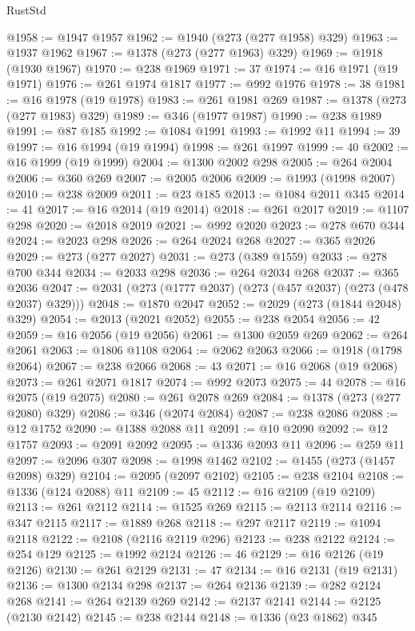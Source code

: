 \begin{lexlean}{RustStd}
\begin{coremodule}
{\begin{coremodule}
{{{{{{{{{{{{{{{{{{{{{{{{{{{{{{{{{{{{{{{{{{{{{{{{{{{{{{{{{{{{{{{{{{{{{{{{{{{{{{{{{{{{{@1958 := @1947 @1957
@1962 := @1940 (@273 (@277 @1958) @329)
@1963 := @1937 @1962
@1967 := @1378 (@273 (@277 @1963) @329)
@1969 := @1918 (@1930 @1967)
@1970 := @238 @1969
@1971 := 37
@1974 := @16 @1971 (@19 @1971)
@1976 := @261 @1974 @1817
@1977 := @992 @1976
@1978 := 38
@1981 := @16 @1978 (@19 @1978)
@1983 := @261 @1981 @269
@1987 := @1378 (@273 (@277 @1983) @329)
@1989 := @346 (@1977 @1987)
@1990 := @238 @1989
@1991 := @87 @185
@1992 := @1084 @1991
@1993 := @1992 @11
@1994 := 39
@1997 := @16 @1994 (@19 @1994)
@1998 := @261 @1997
@1999 := 40
@2002 := @16 @1999 (@19 @1999)
@2004 := @1300 @2002 @298
@2005 := @264 @2004
@2006 := @360 @269
@2007 := @2005 @2006
@2009 := @1993 (@1998 @2007)
@2010 := @238 @2009
@2011 := @23 @185
@2013 := @1084 @2011 @345
@2014 := 41
@2017 := @16 @2014 (@19 @2014)
@2018 := @261 @2017
@2019 := @1107 @298
@2020 := @2018 @2019
@2021 := @992 @2020
@2023 := @278 @670 @344
@2024 := @2023 @298
@2026 := @264 @2024 @268
@2027 := @365 @2026
@2029 := @273 (@277 @2027)
@2031 := @273 (@389 @1559)
@2033 := @278 @700 @344
@2034 := @2033 @298
@2036 := @264 @2034 @268
@2037 := @365 @2036
@2047 := @2031 (@273 (@1777 @2037) (@273 (@457 @2037) (@273 (@478 @2037) @329)))
@2048 := @1870 @2047
@2052 := @2029 (@273 (@1844 @2048) @329)
@2054 := @2013 (@2021 @2052)
@2055 := @238 @2054
@2056 := 42
@2059 := @16 @2056 (@19 @2056)
@2061 := @1300 @2059 @269
@2062 := @264 @2061
@2063 := @1806 @1108
@2064 := @2062 @2063
@2066 := @1918 (@1798 @2064)
@2067 := @238 @2066
@2068 := 43
@2071 := @16 @2068 (@19 @2068)
@2073 := @261 @2071 @1817
@2074 := @992 @2073
@2075 := 44
@2078 := @16 @2075 (@19 @2075)
@2080 := @261 @2078 @269
@2084 := @1378 (@273 (@277 @2080) @329)
@2086 := @346 (@2074 @2084)
@2087 := @238 @2086
@2088 := @12 @1752
@2090 := @1388 @2088 @11
@2091 := @10 @2090
@2092 := @12 @1757
@2093 := @2091 @2092
@2095 := @1336 @2093 @11
@2096 := @259 @11
@2097 := @2096 @307
@2098 := @1998 @1462
@2102 := @1455 (@273 (@1457 @2098) @329)
@2104 := @2095 (@2097 @2102)
@2105 := @238 @2104
@2108 := @1336 (@124 @2088) @11
@2109 := 45
@2112 := @16 @2109 (@19 @2109)
@2113 := @261 @2112
@2114 := @1525 @269
@2115 := @2113 @2114
@2116 := @347 @2115
@2117 := @1889 @268
@2118 := @297 @2117
@2119 := @1094 @2118
@2122 := @2108 (@2116 @2119 @296)
@2123 := @238 @2122
@2124 := @254 @129
@2125 := @1992 @2124
@2126 := 46
@2129 := @16 @2126 (@19 @2126)
@2130 := @261 @2129
@2131 := 47
@2134 := @16 @2131 (@19 @2131)
@2136 := @1300 @2134 @298
@2137 := @264 @2136
@2139 := @282 @2124 @268
@2141 := @264 @2139 @269
@2142 := @2137 @2141
@2144 := @2125 (@2130 @2142)
@2145 := @238 @2144
@2148 := @1336 (@23 @1862) @345
}}}}}}}}}}}}}}}}}}}}}}}}}}}}}}}}}}}}}}}}}}}}}}}}}}}}}}}}}}}}}}}}}}}}}}}}}}}}}}}}}}}}}
\end{coremodule}}
\end{coremodule}
\end{lexlean}
